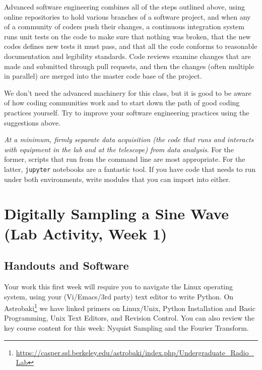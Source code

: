 \documentclass[11pt,preprint]{aastex}
\begin{document}
\noindent
Advanced software engineering combines all of the steps outlined above, using online repositories to hold various
branches of a software project, and when any of a community of coders push their changes, a continuous integration system runs
unit tests on the code to make sure that nothing was broken, that the new codes defines new tests it must pass, and that
all the code conforms to reasonable documentation and legibility standards.  Code reviews examine changes that are
made and submitted through pull requests, and then the changes (often multiple in parallel) are merged into the master code base of the
project.

We don't need the advanced machinery for this class, but it is good to be aware of how coding communities work and
to start down the path of good coding practices yourself. Try to improve your software engineering practices using the
suggestions above.

{\it At a minimum, firmly separate data acquisition (the code that runs and interacts with
equipment in the lab and at the telescope) from data analysis}.  For the former, scripts that run from the command line
are most appropriate. For the latter, {\tt jupyter} notebooks are a fantastic tool. If you have code that needs to
run under both environments, write modules that you can import into either.


\section{Digitally Sampling a Sine Wave (Lab Activity, Week 1)}
\label{nyquist}

\subsection{Handouts and Software}

\noindent
Your work this first week will require you to navigate
the Linux operating system, using your (Vi/Emacs/3rd party) text editor to write Python. 
On Astrobaki\footnote{\url{https://casper.ssl.berkeley.edu/astrobaki/index.php/Undergraduate\_Radio\_Lab}}
we have linked primers on
Linux/Unix, Python Installation and Basic Programming, Unix Text Editors, and Revision Control.  You can
also review the key course content for this week: Nyquist Sampling and the Fourier Transform.
\end{document}
